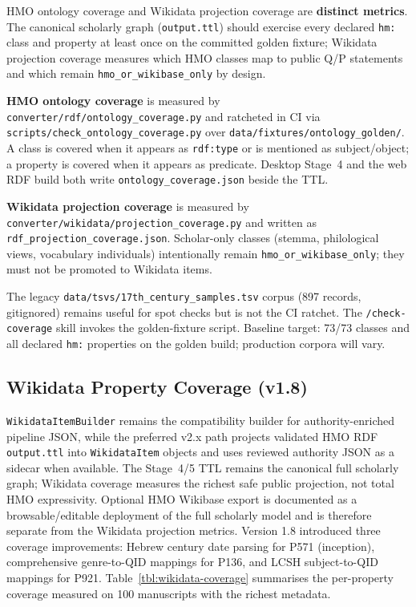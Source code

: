\documentclass[12pt]{article}
\newcommand{\filepath}[1]{\texttt{\small #1}}
\newcommand{\code}[1]{\texttt{#1}}
\begin{document}
HMO ontology coverage and Wikidata projection coverage are \textbf{distinct metrics}. The canonical scholarly graph (\filepath{output.ttl}) should exercise every declared \code{hm:} class and property at least once on the committed golden fixture; Wikidata projection coverage measures which HMO classes map to public Q/P statements and which remain \code{hmo\_or\_wikibase\_only} by design.

\textbf{HMO ontology coverage} is measured by \filepath{converter/rdf/ontology\_coverage.py} and ratcheted in CI via \filepath{scripts/check\_ontology\_coverage.py} over \filepath{data/fixtures/ontology\_golden/}. A class is covered when it appears as \code{rdf:type} or is mentioned as subject/object; a property is covered when it appears as predicate. Desktop Stage~4 and the web RDF build both write \filepath{ontology\_coverage.json} beside the TTL.

\textbf{Wikidata projection coverage} is measured by \filepath{converter/wikidata/projection\_coverage.py} and written as \filepath{rdf\_projection\_coverage.json}. Scholar-only classes (stemma, philological views, vocabulary individuals) intentionally remain \code{hmo\_or\_wikibase\_only}; they must not be promoted to Wikidata items.

The legacy \filepath{data/tsvs/17th\_century\_samples.tsv} corpus (897 records, gitignored) remains useful for spot checks but is not the CI ratchet. The \code{/check-coverage} skill invokes the golden-fixture script. Baseline target: 73/73 classes and all declared \code{hm:} properties on the golden build; production corpora will vary.

\subsection{Wikidata Property Coverage (v1.8)}

\code{WikidataItemBuilder} remains the compatibility builder for authority-enriched pipeline JSON, while the preferred v2.x path projects validated HMO RDF \code{output.ttl} into \code{WikidataItem} objects and uses reviewed authority JSON as a sidecar when available. The Stage~4/5 TTL remains the canonical full scholarly graph; Wikidata coverage measures the richest safe public projection, not total HMO expressivity. Optional HMO Wikibase export is documented as a browsable/editable deployment of the full scholarly model and is therefore separate from the Wikidata projection metrics. Version 1.8 introduced three coverage improvements: Hebrew century date parsing for P571 (inception), comprehensive genre-to-QID mappings for P136, and LCSH subject-to-QID mappings for P921. Table~\ref{tbl:wikidata-coverage} summarises the per-property coverage measured on 100 manuscripts with the richest metadata.
\end{document}
